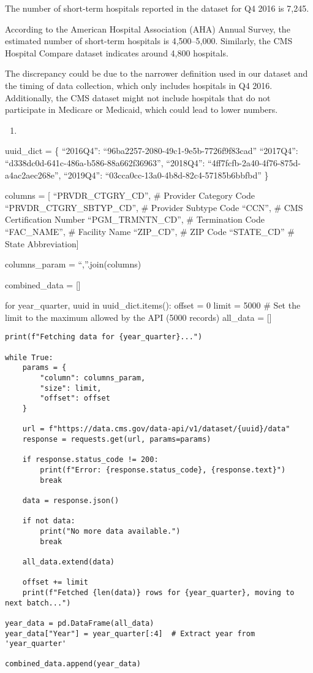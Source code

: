 \documentclass[
  letterpaper,
  DIV=11,
  numbers=noendperiod]{scrartcl}
\providecommand{\tightlist}{%
  \setlength{\itemsep}{0pt}\setlength{\parskip}{0pt}}\usepackage{longtable,booktabs,array}
\begin{document}
The number of short-term hospitals reported in the dataset for Q4 2016
is 7,245.

According to the American Hospital Association (AHA) Annual Survey, the
estimated number of short-term hospitals is 4,500--5,000. Similarly, the
CMS Hospital Compare dataset indicates around 4,800 hospitals.

The discrepancy could be due to the narrower definition used in our
dataset and the timing of data collection, which only includes hospitals
in Q4 2016. Additionally, the CMS dataset might not include hospitals
that do not participate in Medicare or Medicaid, which could lead to
lower numbers.

\begin{enumerate}
\def\labelenumi{\arabic{enumi}.}
\setcounter{enumi}{2}
\tightlist
\item
\end{enumerate}

uuid\_dict = \{ ``2016Q4'': ``96ba2257-2080-49c1-9e5b-7726f9f83cad''
``2017Q4'': ``d338dc0d-641c-486a-b586-88a662f36963'', ``2018Q4'':
``4ff7fcfb-2a40-4f76-875d-a4ac2aec268e'', ``2019Q4'':
``03cca0cc-13a0-4b8d-82c4-57185b6bbfbd'' \}

columns = {[} ``PRVDR\_CTGRY\_CD'', \# Provider Category Code
``PRVDR\_CTGRY\_SBTYP\_CD'', \# Provider Subtype Code ``CCN'', \# CMS
Certification Number ``PGM\_TRMNTN\_CD'', \# Termination Code
``FAC\_NAME'', \# Facility Name ``ZIP\_CD'', \# ZIP Code ``STATE\_CD''
\# State Abbreviation{]}

columns\_param = ``,''.join(columns)

combined\_data = {[}{]}

for year\_quarter, uuid in uuid\_dict.items(): offset = 0 limit = 5000
\# Set the limit to the maximum allowed by the API (5000 records)
all\_data = {[}{]}

\begin{verbatim}
print(f"Fetching data for {year_quarter}...")

while True:
    params = {
        "column": columns_param,
        "size": limit,
        "offset": offset
    }

    url = f"https://data.cms.gov/data-api/v1/dataset/{uuid}/data"
    response = requests.get(url, params=params)

    if response.status_code != 200:
        print(f"Error: {response.status_code}, {response.text}")
        break

    data = response.json()

    if not data:
        print("No more data available.")
        break

    all_data.extend(data)

    offset += limit
    print(f"Fetched {len(data)} rows for {year_quarter}, moving to next batch...")

year_data = pd.DataFrame(all_data)
year_data["Year"] = year_quarter[:4]  # Extract year from 'year_quarter'

combined_data.append(year_data)
\end{verbatim}
\end{document}
